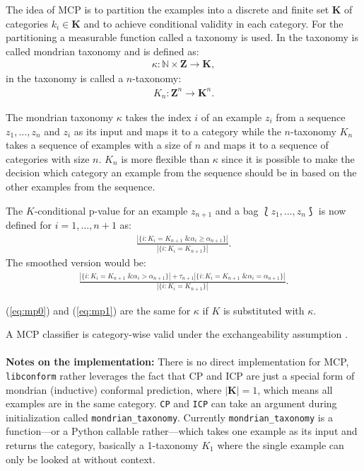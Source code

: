 \documentclass[twoside,11pt]{article}
\def\libconform{\texttt{libconform}}
\begin{document}
The idea of MCP is to partition the examples into a
discrete and finite set $\textbf{K}$ of categories
$k_i \in \textbf{K}$ and to achieve conditional validity in
each category.
For the partitioning a measurable function called a
taxonomy is used.
In \citet[Chapter 4.5]{alrw} the taxonomy is called
mondrian taxonomy and is defined as:
\begin{align*}
  \kappa: \mathbb{N} \times \textbf{Z} \rightarrow
  \textbf{K},
\end{align*}
in \citet[Chapter 2]{cprml} the taxonomy is called a
$n$-taxonomy:
\begin{align*}
  K_n: \textbf{Z}^n \rightarrow \textbf{K}^n.
\end{align*}

The mondrian taxonomy $\kappa$ takes the index $i$ of an
example $z_i$ from a sequence $z_1,\dots,z_n$ and $z_i$ as
its input and maps it to a category while the $n$-taxonomy
$K_n$ takes a sequence of examples with a size of $n$ and
maps it to a sequence of categories with size $n$.
$K_n$ is more flexible than $\kappa$ since it is possible
to make the decision which category an example from the
sequence should be in based on the other examples from the
sequence.

The $K$-conditional p-value for an example $z_{n+1}$ and
a bag $\Lbag z_1,\dots,z_n \Rbag$ is now defined for
$i=1,\dots,n+1$ as:
\begin{align}
  \label{eq:mp0}
  \frac{|\{i:K_i = K_{n+1} \text{ \& } \alpha_i
        \geq \alpha_{n+1}\}|}
  {|\{i: K_i = K_{n+1}\}|}.
\end{align}
The smoothed version would be:
\begin{align}
  \label{eq:mp1}
  \frac{|\{i:K_i = K_{n+1} \text{ \& } \alpha_i >
        \alpha_{n+1}\}| + \tau_{n+1}
        |\{i:K_i = K_{n+1} \text{ \& } \alpha_i =
        \alpha_{n+1}\}|}
  {|\{i: K_i = K_{n+1}\}|}.
\end{align}

(\ref{eq:mp0}) and (\ref{eq:mp1}) are the same for $\kappa$
if $K$ is substituted with $\kappa$.

A MCP classifier is category-wise valid under the
exchangeability assumption \citep[see][]{alrw, cprml}.
\\\\

\noindent
\textbf{Notes on the implementation:}
There is no direct implementation for MCP, \libconform{}
rather leverages the fact that CP and ICP are just a
special form of mondrian (inductive) conformal prediction,
where $|\textbf{K}| = 1$, which means all examples are in
the same category.
\texttt{CP} and \texttt{ICP} can take an argument during
initialization called \texttt{mondrian\_taxonomy}.
Currently \texttt{mondrian\_taxonomy} is a function---or
a Python callable rather---which takes one example as its
input and returns the category, basically a 1-taxonomy
$K_1$ where the single example can only be looked at
without context.
\end{document}
